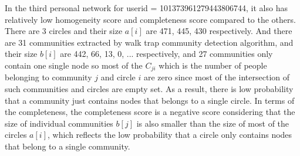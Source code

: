\documentclass[11pt]{article}
\begin{document}
In the third personal network for userid = 101373961279443806744, it also has relatively low homogeneity score and completeness score compared to the others. There are 3 circles and their size $a[i]$ are 471, 445, 430 respectively. And there are 31 communities extracted by walk trap community detection algorithm, and their size $b[i]$ are 442, 66, 13, 0, ... respectively, and 27 communities only contain one single node so most of the $C_{ji}$ which is the number of people belonging to community $j$ and circle $i$ are zero since most of the intersection of such communities and circles are empty set. As a result, there is low probability that a community just contains nodes that belongs to a single circle. In terms of the completeness, the completeness score is a negative score considering that the size of individual communities $b[j]$ is also smaller than the size of most of the circles $a[i]$, which reflects the low probability that a circle only contains nodes that belong to a single community.
\end{document}
